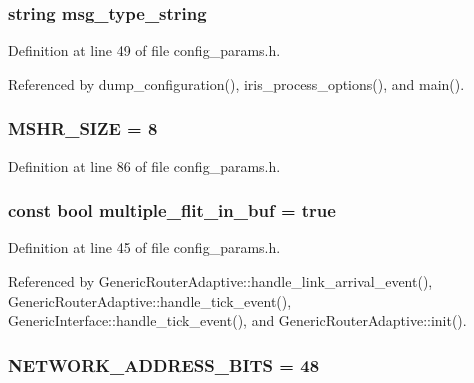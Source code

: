 \subsubsection[{msg\_\-type\_\-string}]{\setlength{\rightskip}{0pt plus 5cm}string {\bf msg\_\-type\_\-string}}\label{config__params_8h_406fb7b866fa102b8c190791ea0919d9}




Definition at line 49 of file config\_\-params.h.

Referenced by dump\_\-configuration(), iris\_\-process\_\-options(), and main().
\subsubsection[{MSHR\_\-SIZE}]{ {\bf MSHR\_\-SIZE} = 8}\label{config__params_8h_4f1d8d474d4e841808eb38cf137c9d6e}




Definition at line 86 of file config\_\-params.h.
\subsubsection[{multiple\_\-flit\_\-in\_\-buf}]{\setlength{\rightskip}{0pt plus 5cm}const bool {\bf multiple\_\-flit\_\-in\_\-buf} = true}\label{config__params_8h_6e9030ac7a1abb7387b696f49bcf0fde}




Definition at line 45 of file config\_\-params.h.

Referenced by GenericRouterAdaptive::handle\_\-link\_\-arrival\_\-event(), GenericRouterAdaptive::handle\_\-tick\_\-event(), GenericInterface::handle\_\-tick\_\-event(), and GenericRouterAdaptive::init().
\subsubsection[{NETWORK\_\-ADDRESS\_\-BITS}]{ {\bf NETWORK\_\-ADDRESS\_\-BITS} = 48}\label{config__params_8h_bee72fa7d3b3eb5cc82e7dc8d6db8222}




